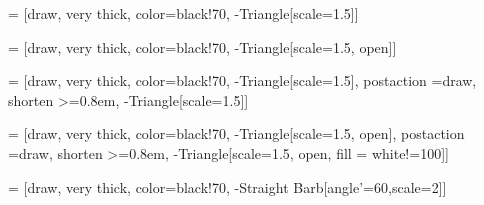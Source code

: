 


\contourlength{1.2pt}
 = [draw, very thick, color=black!70, -{Triangle[scale=1.5]}]

\newcommand{\SymmetricReference}[5]{
\path [triangle] (#4) #3 (#2);
\path [triangle] (#2) #3 (#4) node [midway, above, text width = 2cm, align= center, #5] (TextNode) {\contour{white}{#1}};
}

\newcommand{\AsymmetricReference}[5]{
\path [triangle] (#2) #3 (#4) node [midway, above, text width = 2cm, align= center, #5] (TextNode) {\contour{white}{#1}};
}

 = [draw, very thick, color=black!70, -{Triangle[scale=1.5, open]}]

\newcommand{\HasEventSource}[5]{
\path [triangle2] (#2) #3 (#4) node [midway, above, text width = 2cm, align= center, #5] (TextNode) {\contour{white}{#1}};
}

 = [draw, very thick, color=black!70, -{Triangle[scale=1.5]}, postaction ={draw, shorten >=0.8em, -{Triangle[scale=1.5]}}]

\newcommand{\HasTypeDefinition}[5]{
\path [triangle3] (#2) #3 (#4) node [midway, above, text width = 2cm, align= center, #5] (TextNode) {\contour{white}{#1}};
}

 = [draw, very thick, color=black!70, -{Triangle[scale=1.5, open]}, postaction ={draw, shorten >=0.8em, -{Triangle[scale=1.5, open, fill = white!=100]}}]

\newcommand{\HasSubType}[5]{
\path [triangle4] (#4) #3 (#2) node [midway, above, text width = 2cm, align= center, #5] (TextNode) {\contour{white}{#1}};
}

 = [draw, very thick, color=black!70, -{Straight Barb[angle'=60,scale=2]}]

\newcommand{\HierarchicalReference}[5]{
\path [angle] (#2) #3 (#4) node [midway, above, text width = 2cm, align= center, #5] (TextNode) {\contour{white}{#1}};
}

